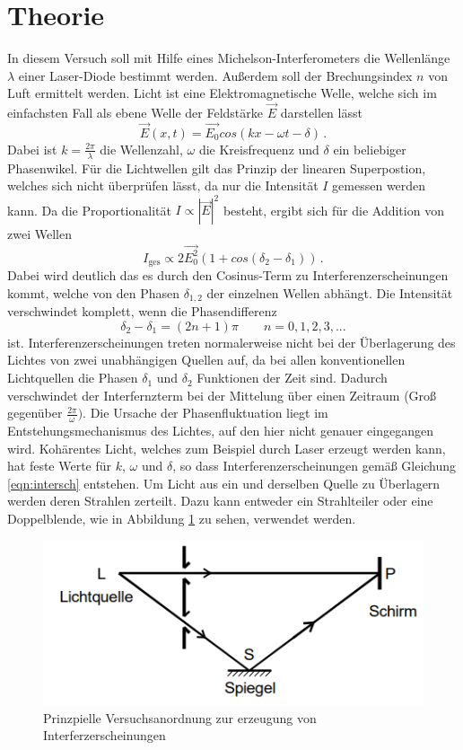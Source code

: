 \section{Theorie}
\label{sec:Theorie}
In diesem Versuch soll mit Hilfe eines Michelson-Interferometers die Wellenlänge $\lambda$ einer Laser-Diode bestimmt werden.
Außerdem soll der Brechungsindex $n$ von Luft ermittelt werden.
Licht ist eine Elektromagnetische Welle, welche sich im einfachsten Fall als ebene Welle der Feldstärke $\vec{E}$ darstellen lässt
\begin{equation*}
    \vec{E}(x,t)=\vec{E_0} cos(kx-\omega t - \delta) \, .
\end{equation*}
Dabei ist $k=\frac{2 \pi}{\lambda}$ die Wellenzahl, $\omega$ die Kreisfrequenz und $\delta$ ein beliebiger Phasenwikel.
Für die Lichtwellen gilt das Prinzip der linearen Superpostion, welches sich nicht überprüfen lässt, da nur die Intensität $I$ gemessen werden kann.
Da die Proportionalität $I \propto |\vec{E}|^2$ besteht, ergibt sich für die Addition von zwei Wellen
\begin{equation}
    I_\text{ges} \propto 2 \vec{E_0^2} (1+cos(\delta_2 - \delta_1)) \, .
    \label{eqn:intersch}
\end{equation}
Dabei wird deutlich das es durch den Cosinus-Term zu Interferenzerscheinungen kommt, welche von den Phasen $\delta_{1,2}$ der einzelnen Wellen abhängt.
Die Intensität verschwindet komplett, wenn die Phasendifferenz
\begin{equation*}
    \delta_2-\delta_1 = (2n+1)\pi \qquad n=0,1,2,3, ...
\end{equation*}
ist. 
Interferenzerscheinungen treten normalerweise nicht bei der Überlagerung des Lichtes von zwei unabhängigen Quellen auf, da bei allen konventionellen Lichtquellen die Phasen 
$\delta_1$ und $\delta_2$ Funktionen der Zeit sind. Dadurch verschwindet der Interfernzterm bei der Mittelung über einen Zeitraum (Groß gegenüber $\frac{2\pi}{\omega})$.
Die Ursache der Phasenfluktuation liegt im Entstehungsmechanismus des Lichtes, auf den hier nicht genauer eingegangen wird.
Kohärentes Licht, welches zum Beispiel durch Laser erzeugt werden kann, hat feste Werte für $k$, $\omega$ und $\delta$, so dass Interferenzerscheinungen gemäß Gleichung \eqref{eqn:intersch} entstehen.
Um Licht aus ein und derselben Quelle zu Überlagern werden deren Strahlen zerteilt. Dazu kann entweder ein Strahlteiler oder eine Doppelblende, wie in Abbildung \ref{fig:dopl} zu sehen, verwendet werden.
\begin{figure}
    \centering
    \caption{Prinzpielle Versuchsanordnung zur erzeugung von Interferzerscheinungen \cite{v401}}
    \label{fig:dopl}
    \includegraphics[width = 0.5 \textwidth]{pics/Aufbau Doppelspalt.png}
\end{figure}
